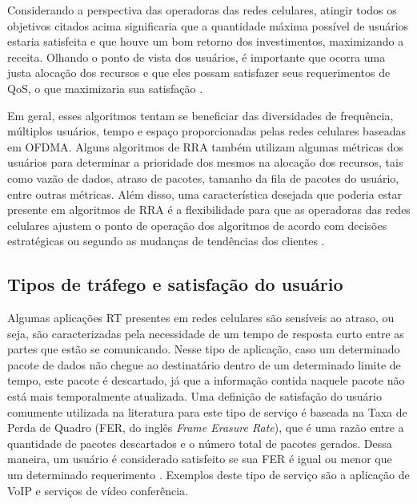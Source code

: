 Considerando a perspectiva das operadoras das redes celulares, atingir todos os objetivos citados acima significaria que a quantidade máxima possível de usuários estaria satisfeita e que houve um bom retorno dos investimentos, maximizando a receita. Olhando o ponto de vista dos usuários, é importante que ocorra uma justa alocação dos recursos e que eles possam satisfazer seus requerimentos de QoS, o que maximizaria sua satisfação \cite{Rodrigues2014_Wiley}.  

Em geral, esses algoritmos tentam se beneficiar das diversidades de frequência, múltiplos usuários, tempo e espaço proporcionadas pelas redes celulares baseadas em \acs{OFDMA}. Alguns algoritmos de RRA também utilizam algumas métricas dos usuários para determinar a prioridade dos mesmos na alocação dos recursos, tais como vazão de dados, atraso de pacotes, tamanho da fila de pacotes do usuário, entre outras métricas. Além disso, uma característica desejada que poderia estar presente em algoritmos de RRA é a flexibilidade para que as operadoras das redes celulares ajustem o ponto de operação dos algoritmos de acordo com decisões estratégicas ou segundo as mudanças de tendências dos clientes \cite{kim2009qos}. 

\subsection{Tipos de tráfego e satisfação do usuário}

Algumas aplicações RT presentes em redes celulares são sensíveis ao atraso, ou seja, são caracterizadas pela necessidade de um tempo de resposta curto entre as partes que estão se comunicando. Nesse tipo de aplicação, caso um determinado pacote de dados não chegue ao destinatário dentro de um determinado limite de tempo, este pacote é descartado, já que a informação contida naquele pacote não está mais temporalmente atualizada. Uma definição de satisfação do usuário comumente utilizada na literatura para este tipo de serviço é baseada na Taxa de Perda de Quadro (FER, do inglês \textit{Frame Erasure Rate}), que é uma razão entre a quantidade de pacotes descartados e o número total de pacotes gerados. Dessa maneira, um usuário é considerado satisfeito se sua \acs{FER} é igual ou menor que um determinado requerimento \cite{Rodrigues2014_Wiley}. Exemplos deste tipo de serviço são a aplicação de \acs{VoIP} e serviços de vídeo conferência.


